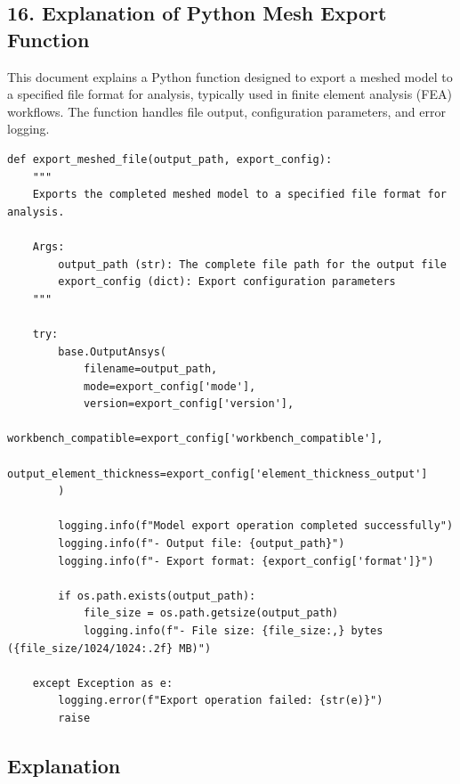 \documentclass{book}
\begin{document}
\begin{itemize}[leftmargin=*,label=\textbullet]
\subsection*{16. Explanation of Python Mesh Export Function}

This document explains a Python function designed to export a meshed model to a specified file format for analysis, typically used in finite element analysis (FEA) workflows. The function handles file output, configuration parameters, and error logging.

\begin{lstlisting}
def export_meshed_file(output_path, export_config):
    """
    Exports the completed meshed model to a specified file format for analysis.
    
    Args:
        output_path (str): The complete file path for the output file
        export_config (dict): Export configuration parameters
    """
    
    try:
        base.OutputAnsys(
            filename=output_path,
            mode=export_config['mode'],
            version=export_config['version'], 
            workbench_compatible=export_config['workbench_compatible'], 
            output_element_thickness=export_config['element_thickness_output']
        )
        
        logging.info(f"Model export operation completed successfully")
        logging.info(f"- Output file: {output_path}")
        logging.info(f"- Export format: {export_config['format']}")
        
        if os.path.exists(output_path):
            file_size = os.path.getsize(output_path)
            logging.info(f"- File size: {file_size:,} bytes ({file_size/1024/1024:.2f} MB)")
        
    except Exception as e:
        logging.error(f"Export operation failed: {str(e)}")
        raise
\end{lstlisting}

\subsection*{Explanation}


\end{itemize}
\end{document}
